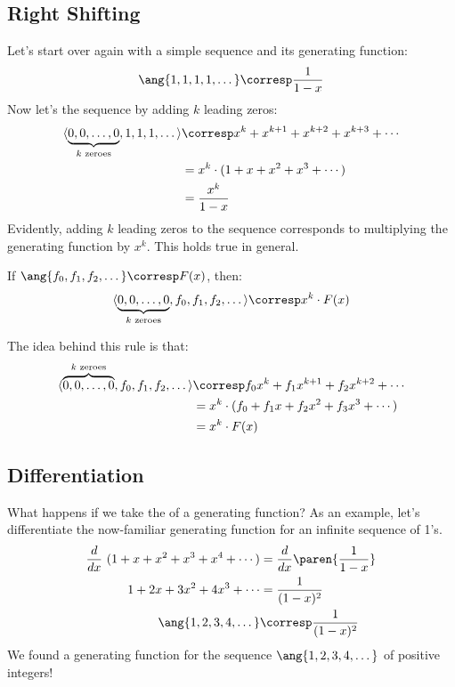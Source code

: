 \subsection{Right Shifting}

Let's start over again with a simple sequence and its generating
function:
%
\[
\ang{1, 1, 1, 1, \dots} \corresp \frac{1}{1-x}
\]
%
Now let's  the sequence by adding $k$ leading
zeros:
%
\begin{align*}
\langle\underbrace{0, 0, \dots, 0}_{\text{$k$ zeroes}}, 1, 1, 1, \dots\rangle
        & \corresp x^k + x^{k+1} + x^{k+2} + x^{k+3} + \cdots \\
        & = x^k \cdot (1  + x + x^2 + x^3 + \cdots) \\
        & = \frac{x^k}{1-x}
\end{align*}
%
Evidently, adding $k$ leading zeros to the sequence corresponds to
multiplying the generating function by $x^k$.  This holds true in
general.

\begin{mathrule}
\label{rule:shift}
If $\ang{f_0, f_1, f_2, \dots} \corresp F(x)$, then:
%
\[
\langle \underbrace{0, 0, \dots, 0}_{\text{$k$ zeroes}}, f_0, f_1, f_2, \dots\rangle \corresp x^k \cdot F(x)
\]
\end{mathrule}

The idea behind this rule is that:
\begin{align*}
\langle\overbrace{0, 0, \dots, 0}^{\text{$k$ zeroes}}, f_0, f_1, f_2, \dots\rangle
    & \corresp f_0 x^k + f_1 x^{k+1} + f_2 x^{k+2} + \cdots \\
    & = x^k \cdot (f_0 + f_1 x + f_2 x^2 + f_3 x^3 + \cdots) \\
    & = x^k \cdot F(x)
\end{align*}

\subsection{Differentiation}

What happens if we take the  of a generating
function?  As an example, let's differentiate the now-familiar
generating function for an infinite sequence of 1's.
%
\begin{align}
\frac{d}{dx} \ (1 + x + x^2 + x^3 + x^4 + \cdots)
        & = \frac{d}{dx} \paren{\frac{1}{1-x}} \notag\\
1 + 2x + 3x^2 + 4x^3 + \cdots & = \frac{1}{(1-x)^2} \label{sumixi-1}\\
\ang{1, 2, 3, 4, \dots}  & \corresp \frac{1}{(1-x)^2}\notag
\end{align}
%
We found a generating function for the sequence $\ang{1, 2, 3, 4,
\dots}$ of positive integers!

